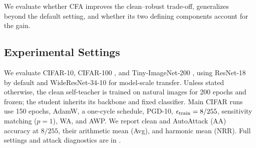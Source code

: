 \documentclass{article} %
\theoremstyle{plain}
\begin{document}
We evaluate whether CFA improves the clean--robust trade-off, generalizes beyond the default setting, and whether its two defining components account for the gain.

\subsection{Experimental Settings}
We evaluate CIFAR-10, CIFAR-100 \citep{krizhevsky2009learning}, and Tiny-ImageNet-200 \citep{le2015tiny}, using ResNet-18 by default and WideResNet-34-10 for model-scale transfer. Unless stated otherwise, the clean self-teacher is trained on natural images for 200 epochs and frozen; the student inherits its backbone and fixed classifier. Main CIFAR runs use 150 epochs, AdamW, a one-cycle schedule, PGD-10, \(\epsilon_{\rm train}=8/255\), sensitivity matching (\(p=1\)), WA, and AWP. We report clean and AutoAttack (AA) accuracy at \(8/255\), their arithmetic mean (Avg), and harmonic mean (NRR). Full settings and attack diagnostics are in .
\end{document}

